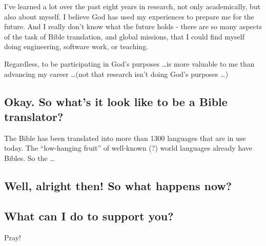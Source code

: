 \documentclass[letterpaper,twocolumn]{article}
\begin{document}
I've learned a lot over the past eight years in research, not only academically, but also about myself. I believe God has used my experiences to prepare me for the future. And I really don't know what the future holds - there are so many aspects of the task of Bible translation, and global missions, that I could find myself doing engineering, software work, or teaching.

Regardless, to be participating in God's purposes \ldots is more valuable to me than advancing my career \ldots (not that research isn't doing God's purposes \ldots)

\subsection{Okay. So what's it look like to be a Bible translator?}

The Bible has been translated into more than 1300 languages that are in use today. The ``low-hanging fruit'' of well-known (?) world languages already have Bibles. So the \ldots

\subsection{Well, alright then! So what happens now?}


\subsection{What can I do to support you?}

Pray!
\end{document}
